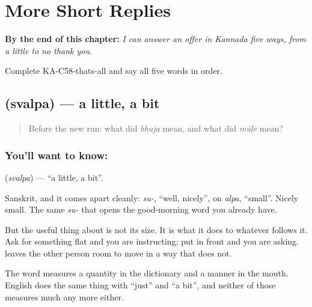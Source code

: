 
\chapter{More Short Replies}
\label{ch:ka-more-replies}

\begin{chapteropening}
\textbf{By the end of this chapter:} \emph{I can answer an offer in Kannada five ways, from a little to no thank you.}

Complete KA-C58-thats-all and say all five words in order.
\end{chapteropening}

\section[\texorpdfstring{\kn{ಸ್ವಲ್ಪ} (svalpa)}{ಸ್ವಲ್ಪ (svalpa)}]{ (svalpa) — a little, a bit}

\label{lesson:KA-C58-a-little}



\begin{quote}
Before the new run: what did \emph{bhuja} mean, and what did \emph{mūḷe} mean?
\end{quote}

\subsection*{You'll want to know: }
\textbf{} (\emph{svalpa}) — \textquotedblleft{}a little, a bit\textquotedblright{}.

Sanskrit, and it comes apart cleanly: \emph{su-}, \textquotedblleft{}well, nicely\textquotedblright{}, on \emph{alpa}, \textquotedblleft{}small\textquotedblright{}. Nicely small. The same \emph{su-} that opens the good-morning word you already have.

But the useful thing about  is not its size. It is what it does to whatever follows it. Ask for something flat and you are instructing; put  in front and you are asking.    leaves the other person room to move in a way that   does not.

The word measures a quantity in the dictionary and a manner in the mouth. English does the same thing with \textquotedblleft{}just\textquotedblright{} and \textquotedblleft{}a bit\textquotedblright{}, and neither of those measures much any more either.

